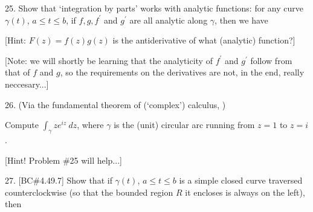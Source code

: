 



\loadmsbm

\dl{\displaystyle}
\ctln{\centerline}
\ssk{\smallskip}
\msk{\medskip}
\bsk{\bigskip}
\ubr{\underbar}

\overfullrule=0pt
\nopagenumbers



\msk


\bsk

\bsk

\item{25.} Show that `integration by parts' works with analytic functions: 
for any curve $\gamma(t)$, $a\leq t\leq b$, 
if $f,g,f^\prime$ and $g^\prime$ are all analytic along $\gamma$, then 
we have

\ssk


\ssk

\item{} [Hint: $F(z)=f(z)g(z)$ is the antiderivative of what (analytic) function?]

\item{} [Note: we will shortly be learning that the analyticity of $f^\prime$ and $g^\prime$ follow from that of $f$ 
and $g$, so the requirements on the derivatives are not, in the end, really neccesary...]


 
\bsk

\item{26.} (Via the fundamental theorem of (`complex') calculus, ) 

\item{} Compute $\int_\gamma ze^{iz}\ dz$, where
$\gamma$ is the (unit) circular arc running from $z=1$ to $z=i$.

\item{} [Hint! Problem \#25 will help...]

\bsk

\item{27.} [BC\#4.49.7] Show that if $\gamma(t)$, $a\leq t\leq b$ is a simple closed curve traversed counterclockwise (so that the bounded
region $R$ it encloses is always on the left), then 

